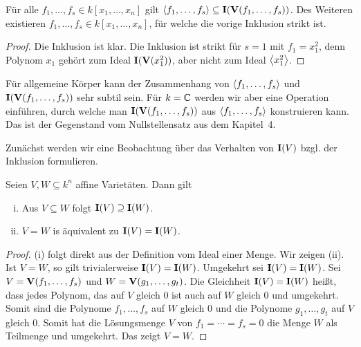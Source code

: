 \documentclass[11pt]{article}
\numberwithin{equation}{section}
\begin{document}
\begin{lemma} 
	Für alle $f_1,\ldots,f_s \in k[x_1,\ldots,x_n]$ gilt $\left< f_1,\ldots,f_s \right> \subseteq \mathbf{I}(\mathbf{V}(f_1,\ldots,f_s))$. Des Weiteren existieren $f_1,\ldots,f_s \in k[x_1,\ldots,x_n]$, für welche die vorige Inklusion strikt ist. 
\end{lemma} 
\begin{proof}
	Die Inklusion ist klar. Die Inklusion ist strikt für $s=1$ mit $f_1 = x_1^2$, denn Polynom $x_1$ gehört zum Ideal $\mathbf{I}(\mathbf{V}(x_1^2))$, aber nicht zum Ideal $\left< x_1^2 \right>$. 
\end{proof} 

Für allgemeine Körper kann der Zusammenhang von $\left< f_1,\dots,f_s \right>$ und $\mathbf{I}(\mathbf{V}(f_1,\ldots,f_s))$ sehr subtil sein. Für $k = \mathbb{C}$ werden wir aber eine Operation einführen, durch welche man $\mathbf{I}(\mathbf{V}(f_1,\ldots,f_s))$ aus $\left< f_1,\ldots,f_s \right>$ konstruieren kann. Das ist der Gegenstand vom Nullstellensatz aus dem Kapitel~4. 

Zunächst werden wir eine Beobachtung über das Verhalten von $\mathbf{I}(V)$ bzgl. der Inklusion formulieren. 

\begin{proposition} \label{prop:var:vs:ideal}
	Seien $V, W \subseteq k^n$ affine Varietäten. Dann gilt 
	\begin{enumerate}[(i)]
		\item Aus $V \subseteq W$ folgt $\mathbf{I}(V) \supseteq \mathbf{I}(W)$. 
		\item $V=W$ is äquivalent zu $\mathbf{I}(V)=\mathbf{I}(W)$. 
	\end{enumerate} 
\end{proposition} 
\begin{proof}
	(i) folgt direkt aus der Definition vom Ideal einer Menge. Wir zeigen (ii). Ist $V=W$, so gilt trivialerweise $\mathbf{I}(V) = \mathbf{I}(W)$. Umgekehrt sei $\mathbf{I}(V)= \mathbf{I}(W)$. Sei $V =\mathbf{V}(f_1,\ldots,f_s)$ und $W = \mathbf{V}(g_1,\ldots,g_t)$. Die Gleichheit $\mathbf{I}(V) = \mathbf{I}(W)$ heißt, dass jedes Polynom, das auf $V$ gleich $0$ ist auch auf $W$ gleich $0$ und umgekehrt. Somit sind die Polynome $f_1,\ldots,f_s$ auf $W$ gleich $0$ und die Polynome $g_1,\ldots,g_t$ auf $V$ gleich $0$. Somit hat die Lösungsmenge $V$ von $f_1 = \cdots =f _s=0$ die Menge $W$ als Teilmenge und umgekehrt. Das zeigt $V=W$. 
\end{proof} 
\end{document}
